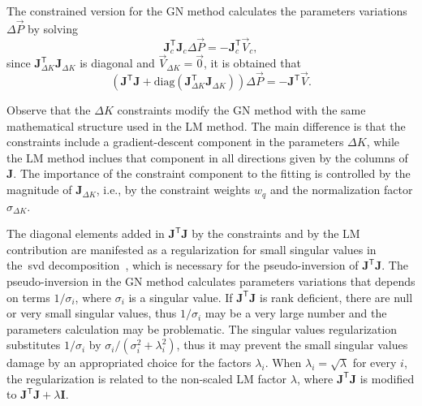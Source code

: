 The constrained version for the GN method calculates the parameters variations $\Delta \vec{P}$ by solving
\begin{equation}
\mathbf{J}^{\mathsf{T}}_c\mathbf{J}_c\Delta \vec{P} = - \mathbf{J}^{\mathsf{T}}_c\vec{V}_c,
\end{equation}
since $\mathbf{J}^{\mathsf{T}}_{\Delta K}\mathbf{J}_{\Delta K}$ is diagonal and $\vec{V}_{\Delta K} = \vec{0}$, it is obtained that
\begin{equation}
    \left(\mathbf{J}^{\mathsf{T}}\mathbf{J}  + \mathrm{diag}\left(\mathbf{J}^{\mathsf{T}}_{\Delta K}\mathbf{J}_{\Delta K}\right) \right)\Delta \vec{P} =  - \mathbf{J}^{\mathsf{T}}\vec{V}.
    \label{eq:gn_modified}
\end{equation}

Observe that the $\Delta K$ constraints modify the GN method with the same mathematical structure used in the LM method. The main difference is that the constraints include a gradient-descent component in the parameters $\Delta K$, while the LM method inclues that component in all directions given by the columns of $\mathbf{J}$. The importance of the constraint component to the fitting is controlled by the magnitude of $\mathbf{J}_{\Delta K}$, i.e., by the constraint weights $w_q$ and the normalization factor $\sigma_{\Delta K}$. 

The diagonal elements added in $\mathbf{J}^{\mathsf{T}}\mathbf{J}$ by the constraints and by the LM contribution are manifested as a regularization for small singular values in the~\gls{svd} decomposition~\cite{huang2019beam}, which is necessary for the pseudo-inversion of $\mathbf{J}^{\mathsf{T}}\mathbf{J}$. The pseudo-inversion in the GN method calculates parameters variations that depends on terms $1/\sigma_i$, where $\sigma_i$ is a singular value. If $\mathbf{J}^{\mathsf{T}}\mathbf{J}$ is rank deficient, there are null or very small singular values, thus $1/\sigma_i$ may be a very large number and the parameters calculation may be problematic. The singular values regularization substitutes $1/\sigma_i$ by $\sigma_i/\left(\sigma_i^2 + \lambda_i^2\right)$, thus it may prevent the small singular values damage by an appropriated choice for the factors $\lambda_i$. When $\lambda_i = \sqrt{\lambda}$ for every $i$, the regularization is related to the non-scaled LM factor $\lambda$, where $\mathbf{J}^{\mathsf{T}}\mathbf{J}$ is modified to $\mathbf{J}^{\mathsf{T}}\mathbf{J} + \lambda \mathbf{I}$.

